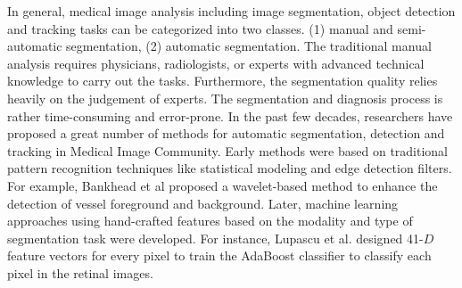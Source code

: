 \documentclass{ieeeaccess}
\begin{document}
In general, medical image analysis including image segmentation, object detection and tracking tasks can be categorized into two classes. (1) manual and semi-automatic segmentation, (2) automatic segmentation.  The traditional manual analysis requires physicians, radiologists, or experts with advanced technical knowledge to carry out the tasks. Furthermore, the segmentation quality relies heavily on the judgement of experts. The segmentation and diagnosis process is rather time-consuming and error-prone. In the past few decades, researchers have proposed a great number of methods for automatic segmentation, detection and tracking in Medical Image Community. Early methods were based on traditional pattern recognition techniques like statistical modeling and edge detection filters. For example, Bankhead et al\cite{PeterNGT12} proposed a wavelet-based method to enhance the detection of vessel foreground and background. Later, machine learning approaches using hand-crafted features based on the modality and type of segmentation task were developed. For instance, Lupascu et al. \cite{LupascuTT10} designed 41-$D$ feature vectors for every pixel to train the AdaBoost classifier to classify each pixel in the retinal images. 
\end{document}
